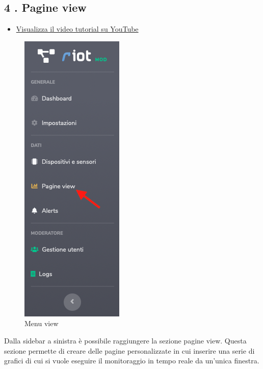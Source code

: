 \newpage \subsection{4 . Pagine view}
	
	\begin{itemize}
		\item \href{https://www.youtube.com/watch?v=PjySMOLCtMA&list=PLPKYjnuIh1FA3b3jn_bwY_ztYzaFn2mIT&index=7}{Visualizza il video tutorial su YouTube} 
	\end{itemize}

	\begin{figure}[H]
		\centering
		\includegraphics[scale=0.600]{res/images/membro/menuView.png}
		\caption{Menu view}
	\end{figure}
	Dalla sidebar a sinistra è possibile raggiungere la sezione pagine view.
	Questa sezione permette di creare delle pagine personalizzate in cui inserire una serie di grafici di cui si vuole eseguire il monitoraggio in tempo reale da un'unica finestra.
